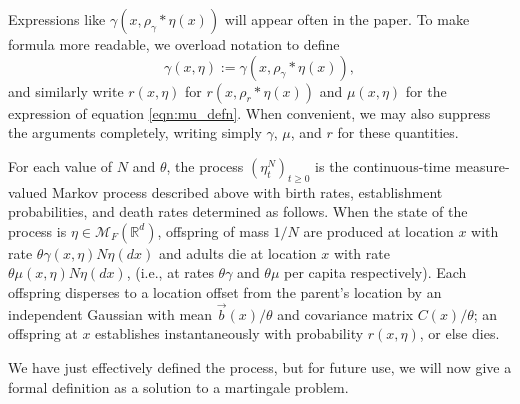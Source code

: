 \documentclass[12pt]{article}
\newcommand{\IR}{\mathbb R}
\newcommand{\meanq}{\vec b}    %
\newcommand{\covq}{C}     %
\newcommand{\kernel}{\rho}  %
\newcommand{\smooth}[1]{\kernel_{#1} \! * \!}  %
\newcommand{\measures}{\mathcal{M}_F(\IR^d)} %
\begin{document}
Expressions like $\gamma(x, \smooth{\gamma} \eta(x))$ will appear often in the paper.
To make formula more readable, we overload notation to define
$$
    \gamma(x, \eta) := \gamma(x, \smooth{\gamma} \eta(x)) ,
$$
and similarly write $r(x, \eta)$ for $r(x, \smooth{r} \eta(x))$
and $\mu(x, \eta)$ for the expression of equation \eqref{eqn:mu_defn}.
When convenient, we may also suppress the arguments completely,
writing simply $\gamma$, $\mu$, and $r$ for these quantities.

For each value of $N$ and $\theta$,
the process $\left(\eta^N_t \right)_{t \ge 0}$
is the continuous-time measure-valued Markov process described above
with birth rates, establishment probabilities, and death rates
determined as follows.
When the state of the process is $\eta \in \measures$,
offspring of mass $1/N$ are produced at location $x$
with rate $\theta \gamma(x, \eta) N \eta(dx)$
and adults die at location $x$ with rate $\theta \mu(x, \eta) N \eta(dx)$,
(i.e., at rates $\theta \gamma$ and $\theta \mu$ per capita respectively).
Each offspring disperses to a location offset from the parent's location
by an independent Gaussian with mean $\meanq(x) / \theta$
and covariance matrix $\covq(x) / \theta$;
an offspring at $x$ establishes instantaneously
with probability $r(x, \eta)$, or else dies.

We have just effectively defined the process, but for future use,
we will now give a formal definition as a solution to a martingale problem.
\end{document}
